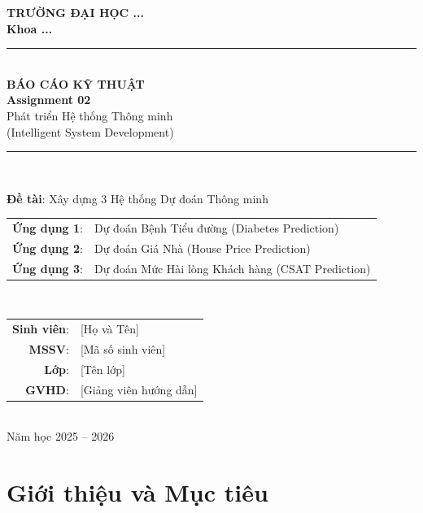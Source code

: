 \documentclass[12pt, a4paper]{article}
\begin{document}
\begin{titlepage}
\centering
\vspace*{1cm}

{\Large \textbf{TRƯỜNG ĐẠI HỌC ...}}\\[0.3cm]
{\large \textbf{Khoa ...}}\\[2cm]

\rule{\linewidth}{0.5mm}\\[0.6cm]
{\Huge \textbf{BÁO CÁO KỸ THUẬT}}\\[0.3cm]
{\LARGE \textbf{Assignment 02}}\\[0.3cm]
{\Large Phát triển Hệ thống Thông minh\\(Intelligent System Development)}\\[0.3cm]
\rule{\linewidth}{0.5mm}\\[2cm]

{\large
\textbf{Đề tài}: Xây dựng 3 Hệ thống Dự đoán Thông minh\\[0.3cm]
\begin{tabular}{rl}
\textbf{Ứng dụng 1}: & Dự đoán Bệnh Tiểu đường (Diabetes Prediction)\\
\textbf{Ứng dụng 2}: & Dự đoán Giá Nhà (House Price Prediction)\\
\textbf{Ứng dụng 3}: & Dự đoán Mức Hài lòng Khách hàng (CSAT Prediction)\\
\end{tabular}
}\\[2cm]

{\large
\begin{tabular}{rl}
\textbf{Sinh viên}: & [Họ và Tên] \\
\textbf{MSSV}: & [Mã số sinh viên] \\
\textbf{Lớp}: & [Tên lớp] \\
\textbf{GVHD}: & [Giảng viên hướng dẫn] \\
\end{tabular}
}\\[2cm]

{\large Năm học 2025 -- 2026}

\end{titlepage}

\tableofcontents
\newpage

\section{Giới thiệu và Mục tiêu}
\end{document}
